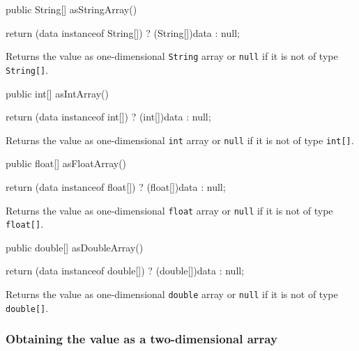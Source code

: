 \begin{code}

   public String[] asStringArray() \begin{hide} {
      return (data instanceof String[]) ? (String[])data : null;
   }
   \end{hide}
\end{code}
\begin{tabb}
Returns the value as one-dimensional \texttt{String} array or \texttt{null} if it is not of type \texttt{String[]}.
\end{tabb}
\begin{code}
      
   public int[] asIntArray() \begin{hide} {
      return (data instanceof int[]) ? (int[])data : null;
   }
   \end{hide}
\end{code}
\begin{tabb}
Returns the value as one-dimensional \texttt{int} array or \texttt{null} if it is not of type \texttt{int[]}.
\end{tabb}
\begin{code}
   
   public float[] asFloatArray() \begin{hide} {
      return (data instanceof float[]) ? (float[])data : null;
   }
   \end{hide}
\end{code}
\begin{tabb}
Returns the value as one-dimensional \texttt{float} array or \texttt{null} if it is not of type \texttt{float[]}.
\end{tabb}
\begin{code}
   
   public double[] asDoubleArray() \begin{hide} {
      return (data instanceof double[]) ? (double[])data : null;
   }
   \end{hide}
\end{code}
\begin{tabb}
Returns the value as one-dimensional \texttt{double} array or \texttt{null} if it is not of type \texttt{double[]}.
\end{tabb}
   

\subsubsection*{Obtaining the value as a two-dimensional array}

